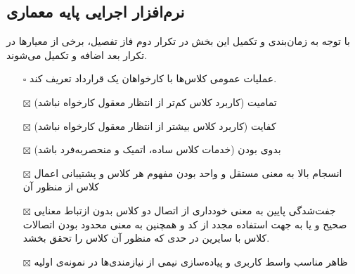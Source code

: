 \subsection{نرم‌افزار اجرایی پایه معماری}
با توجه به زمان‌بندی و تکمیل این بخش در تکرار دوم فاز تفصیل، برخی از معیارها در تکرار بعد اضافه و تکمیل می‌شوند.
\begin{itemize}
	\item[$\square$]
	عملیات عمومی کلاس‌ها با کارخواهان یک قرارداد تعریف کند.
	\item[$\boxtimes$]
	تمامیت (کاربرد کلاس کم‌تر از انتظار معقول کارخواه نباشد)
	\item[$\boxtimes$]
	کفایت (کاربرد کلاس بیشتر از انتظار معقول کارخواه نباشد)
	\item[$\boxtimes$]
	بدوی بودن (خدمات کلاس ساده، اتمیک و منحصربه‌فرد باشد)
	\item[$\boxtimes$]
	انسجام بالا به معنی مستقل و واحد بودن مفهوم هر کلاس و پشتیبانی اعمال کلاس از منظور آن
	\item[$\boxtimes$]
	جفت‌شدگی پایین به معنی خودداری از اتصال دو کلاس بدون ازتباط معنایی صحیح و یا به جهت استفاده مجدد از کد و همچنین به معنی محدود بودن اتصالات کلاس با سایرین در حدی که منظور آن کلاس را تحقق بخشد.
	\item[$\boxtimes$]
	ظاهر مناسب واسط کاربری و پیاده‌سازی نیمی از نیازمندی‌ها در نمونه‌ی اولیه
\end{itemize}

